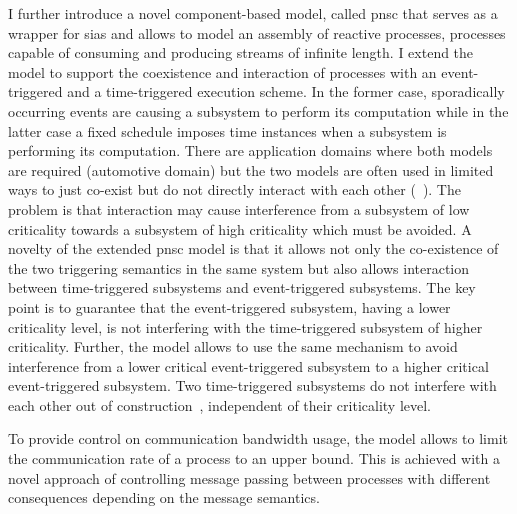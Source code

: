I further introduce a novel component-based model, called \gls{pnsc} that serves as a wrapper for \glspl{sia} and allows to model an assembly of reactive processes, \ie processes capable of consuming and producing streams of infinite length.
I extend the model to support the coexistence and interaction of processes with an event-triggered and a time-triggered execution scheme.
In the former case, sporadically occurring events are causing a subsystem to perform its computation while in the latter case a fixed schedule imposes time instances when a subsystem is performing its computation.
There are application domains where both models are required (\eg automotive domain) but the two models are often used in limited ways to just co-exist but do not directly interact with each other (\eg~\cite{ferreira2002, steiner2011, obermaisser2006}).
The problem is that interaction may cause interference from a subsystem of low criticality towards a subsystem of high criticality which must be avoided.
A novelty of the extended \gls{pnsc} model is that it allows not only the co-existence of the two triggering semantics in the same system but also allows interaction between time-triggered subsystems and event-triggered subsystems.
The key point is to guarantee that the event-triggered subsystem, having a lower criticality level, is not interfering with the time-triggered subsystem of higher criticality.
Further, the model allows to use the same mechanism to avoid interference from a lower critical event-triggered subsystem to a higher critical event-triggered subsystem.
Two time-triggered subsystems do not interfere with each other out of construction~\cite{kopetz2002}, independent of their criticality level.

To provide control on communication bandwidth usage, the model allows to limit the communication rate of a process to an upper bound.
This is achieved with a novel approach of controlling message passing between processes with different consequences depending on the message semantics.

